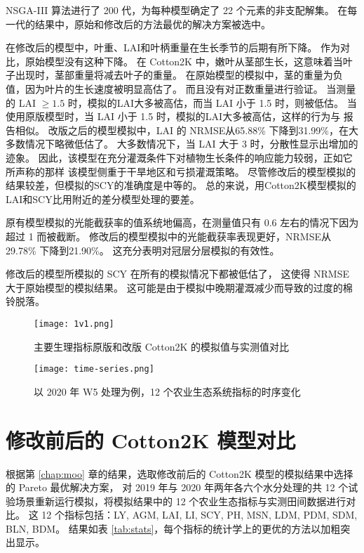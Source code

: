 NSGA-III 算法进行了 200 代，为每种模型确定了 22 个元素的非支配解集。
在每一代的结果中，原始和修改后的方法最优的解决方案被选中。

在修改后的模型中，叶重、LAI和叶柄重量在生长季节的后期有所下降。
作为对比，原始模型没有这种下降。
在 Cotton2K 中，嫩叶从茎部生长，这意味着当叶子出现时，茎部重量将减去叶子的重量。
在原始模型的模拟中，茎的重量为负值，因为叶片的生长速度被明显高估了。
而且没有对正数重量进行验证。
当测量的 LAI $\ge 1.5$ 时，模拟的LAI大多被高估，而当 LAI 小于 1.5 时，则被低估。
当使用原版模型时，当 LAI 小于 1.5 时，模拟的LAI大多被高估，这样的行为与  报告相似。
改版之后的模型模拟中，LAI 的 NRMSE从65.88\% 下降到31.99\%，在大多数情况下略微低估了。
大多数情况下，当 LAI 大于 3 时，分散性显示出增加的迹象。
因此，该模型在充分灌溉条件下对植物生长条件的响应能力较弱，正如它所声称的那样
该模型侧重于干旱地区和亏损灌溉策略。
尽管修改后的模型模拟的结果较差，但模拟的SCY的准确度是中等的。
总的来说，用Cotton2K模型模拟的LAI和SCY比用附近的差分模型处理的要差。

原有模型模拟的光能截获率的值系统地偏高，在测量值只有 0.6 左右的情况下因为超过 1 而被截断。
修改后的模型模拟中的光能截获率表现更好，NRMSE从 29.78\% 下降到21.90\%。
这充分表明对冠层分层模拟的有效性。

修改后的模型所模拟的 SCY 在所有的模拟情况下都被低估了，
这使得 NRMSE 大于原始模型的模拟结果。
这可能是由于模拟中晚期灌溉减少而导致的过度的棉铃脱落。

\begin{figure}
    \centering
    \texttt{[image: 1v1.png]}
    \caption{主要生理指标原版和改版 Cotton2K 的模拟值与实测值对比}
\end{figure}

\begin{figure}
    \centering
    \texttt{[image: time-series.png]}
    \caption{以 2020 年 W5 处理为例，12 个农业生态系统指标的时序变化}
\end{figure}
\section{修改前后的 Cotton2K 模型对比}

根据第 \ref{chap:moo} 章的结果，选取修改前后的 Cotton2K 模型的模拟结果中选择的 Pareto 最优解决方案，%
对 2019 年与 2020 年两年各六个水分处理的共 12 个试验场景重新运行模拟，将模拟结果中的 12 个农业生态指标与实测田间数据进行对比。%
这 12 个指标包括：LY, AGM, LAI, LI, SCY, PH, MSN, LDM, PDM, SDM, BLN, BDM。%
结果如表 \ref{tab:stats}，每个指标的统计学上的更优的方法以加粗突出显示。

